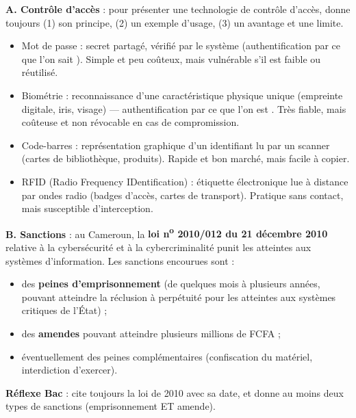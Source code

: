 \documentclass[11pt]{article}
\newcommand{\cle}[1]{{\popxbold\color{popdark}#1}}
\begin{document}
\begin{methode}
\textbf{A. Contrôle d'accès} : pour présenter une technologie de contrôle d'accès, donne toujours (1) son principe, (2) un exemple d'usage, (3) un avantage et une limite.
\begin{itemize}
  \item \cle{Mot de passe} : secret partagé, vérifié par le système (authentification par \og ce que l'on sait \fg). Simple et peu coûteux, mais vulnérable s'il est faible ou réutilisé.
  \item \cle{Biométrie} : reconnaissance d'une caractéristique physique unique (empreinte digitale, iris, visage) — authentification par \og ce que l'on est \fg. Très fiable, mais coûteuse et non révocable en cas de compromission.
  \item \cle{Code-barres} : représentation graphique d'un identifiant lu par un scanner (cartes de bibliothèque, produits). Rapide et bon marché, mais facile à copier.
  \item \cle{RFID} (Radio Frequency IDentification) : étiquette électronique lue à distance par ondes radio (badges d'accès, cartes de transport). Pratique sans contact, mais susceptible d'interception.
\end{itemize}
\textbf{B. Sanctions} : au Cameroun, la \textbf{loi n\textsuperscript{o} 2010/012 du 21 décembre 2010} relative à la cybersécurité et à la cybercriminalité punit les atteintes aux systèmes d'information. Les sanctions encourues sont :
\begin{itemize}
  \item des \textbf{peines d'emprisonnement} (de quelques mois à plusieurs années, pouvant atteindre la réclusion à perpétuité pour les atteintes aux systèmes critiques de l'État) ;
  \item des \textbf{amendes} pouvant atteindre plusieurs millions de FCFA ;
  \item éventuellement des peines complémentaires (confiscation du matériel, interdiction d'exercer).
\end{itemize}
\textbf{Réflexe Bac} : cite toujours la loi de 2010 avec sa date, et donne au moins deux types de sanctions (emprisonnement ET amende).
\end{methode}
\end{document}
